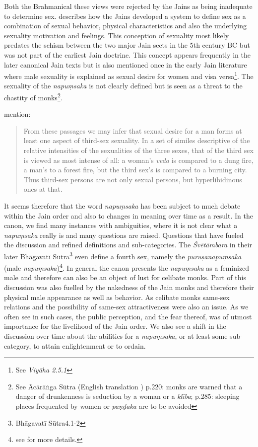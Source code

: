Both the Brahmanical these views were rejected by the Jains as being inadequate to determine sex. \cite{dundas} describes how the Jains developed a system to define sex as a combination of sexual behavior, physical characteristics and also the underlying sexuality motivation and feelings. This conception of sexuality most likely predates the schism between the two major Jain sects in the 5th century BC but was not part of the earliest Jain doctrine. This concept appears frequently in the later canonical Jain texts but is also mentioned once in the early Jain literature where male sexuality is explained as sexual desire for women and visa versa\footnote{See {\em Viyāha 2.5.1}}. The sexuality of the {\em napuṃsaka} is not clearly defined but is seen as a threat to the chastity of monks\footnote{See Ācārāṅga Sūtra (English translation \cite{jacobi}) p.220: monks are warned that a danger of drunkenness is seduction by a woman or a {\em klība}; p.285: sleeping places frequented by women or {\em paṇḍaka} are to be avoided}.

\cite{zwilling} mention:

\begin{quote}
From these passages we may infer that sexual desire for a man forms at least one aspect of third-sex sexuality. In a set of similes descriptive of the relative intensities of the sexualities of the three sexes, that of the third sex is viewed as most intense of all: a woman's {\em veda} is compared to a dung fire, a man's to a forest fire, but the third sex's is compared to a burning city. Thus third-sex persons are not only sexual persons, but hyperlibidinous ones at that.
\end{quote}

It seems therefore that the word {\em napuṃsaka} has been subject to much debate within the Jain order and also to changes in meaning over time as a result. In the canon, we find many instances with ambiguities, where it is not clear what a {\em napuṃsaka} really is and many questions are raised. Questions that have fueled the discussion and refined definitions and sub-categories. The {\em Śvētāmbara} in their later Bhāgavatī Sūtra\footnote{Bhāgavatī Sūtra4.1-2} even define a fourth sex, namely the {\em puruṣanapuṃsaka} (male {\em napuṃsaka})\footnote{see \cite{zwilling} for more details.}. In general the canon presents the {\em napuṃsaka} as a feminized male and therefore can also be an object of lust for celibate monks. Part of this discussion was also fuelled by the nakedness of the Jain monks and therefore their physical male appearance as well as behavior. As celibate monks same-sex relations and the possibility of same-sex attractiveness were also an issue. As we often see in such cases, the public perception, and the fear thereof, was of utmost importance for the livelihood of the Jain order. We also see a shift in the discussion over time about the abilities for a {\em napuṃsaka}, or at least some sub-category, to attain enlightenment or to ordain.



